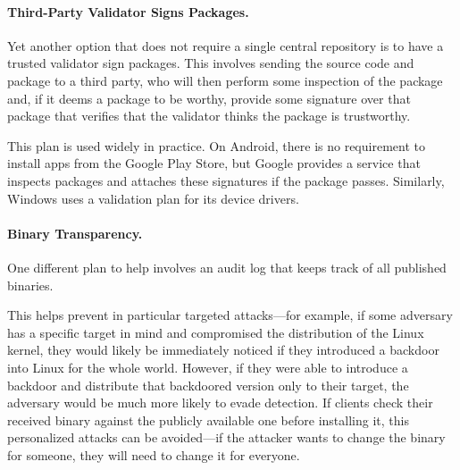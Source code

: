 \paragraph{Third-Party Validator Signs Packages.}
Yet another option that does not require a single central repository is to have a trusted validator sign packages. This involves sending the source code and package to a third party, who will then perform some inspection of the package and, if it deems a package to be worthy, provide some signature over that package that verifies that the validator thinks the package is trustworthy.

This plan is used widely in practice. On Android, there is no requirement to install apps from the Google Play Store, but Google provides a service that inspects packages and attaches these signatures if the package passes. Similarly, Windows uses a validation plan for its device drivers. 

\paragraph{Binary Transparency.}
One different plan to help involves an audit log that keeps track of all published binaries.

This helps prevent in particular targeted attacks---for example, if some adversary has a specific target in mind and compromised the distribution of the Linux kernel, they would likely be immediately noticed if they introduced a backdoor into Linux for the whole world. However, if they were able to introduce a backdoor and distribute that backdoored version only to their target, the adversary would be much more likely to evade detection. If clients check their received binary against the publicly available one before installing it, this personalized attacks can be avoided---if the attacker wants to change the binary for someone, they will need to change it for everyone.

